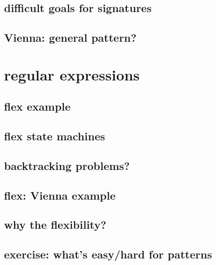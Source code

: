 \subsection{difficult goals for signatures}


\subsection{Vienna: general pattern?}


\section{regular expressions}


\subsection{flex example}


\subsection{flex state machines}




\subsection{backtracking problems?}




\subsection{flex: Vienna example}


\subsection{why the flexibility?}

\subsection{exercise: what's easy/hard for patterns}


